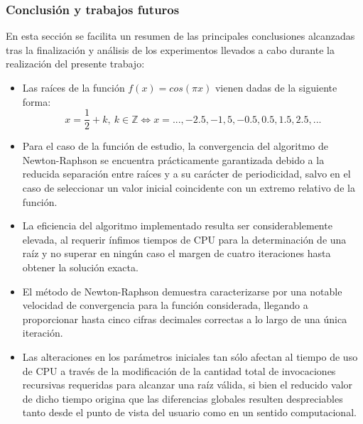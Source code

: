 \documentclass{beamer}
\begin{document}
\begin{frame}
\frametitle{Conclusión y trabajos futuros}
En esta sección se facilita un resumen de las principales conclusiones alcanzadas
tras la finalización y análisis de los experimentos llevados a cabo durante la
realización del presente trabajo:

\begin{itemize}
    \item
      Las raíces de la función $f(x) = cos (\pi x)$ vienen dadas de la siguiente forma:
      $$x = \frac{1}{2} + k, \ k \in \mathbb{Z} \iff x = ..., -2.5, -1,5, -0.5, 0.5, 1.5, 2.5, ...$$
    \pause  
    \item
      Para el caso de la función de estudio, la convergencia del algoritmo de Newton-Raphson
      se encuentra prácticamente garantizada debido a la reducida separación entre raíces y 
      a su carácter de periodicidad, salvo en el caso de seleccionar un valor inicial coincidente
      con un extremo relativo de la función. 

\end{itemize} 
\end{frame}
\begin{frame}
\begin{itemize} 
    \item
      La eficiencia del algoritmo implementado resulta ser considerablemente elevada, al requerir
      ínfimos tiempos de CPU para la determinación de una raíz y no superar en ningún caso el 
      margen de cuatro iteraciones hasta obtener la solución exacta.
    \pause  
    \item
      El método de Newton-Raphson demuestra caracterizarse por una notable velocidad de convergencia
      para la función considerada, llegando a proporcionar hasta cinco cifras decimales correctas a 
      lo largo de una única iteración.
    \pause  
    \item
      Las alteraciones en los parámetros iniciales tan sólo afectan al tiempo de uso de CPU a través
      de la modificación de la cantidad total de invocaciones recursivas requeridas para alcanzar
      una raíz válida, si bien el reducido valor de dicho tiempo origina que las diferencias globales
      resulten despreciables tanto desde el punto de vista del usuario como en un sentido computacional.

\end{itemize}
\end{frame}
\end{document}
